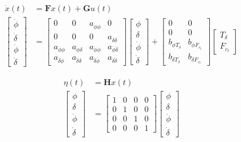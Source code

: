 \documentclass[twocolumn,10pt]{asme2e}
\begin{document}
\begin{equation}
	\begin{split}
		\dot{x}(t) & =
		\mathbf{F}x(t) + \mathbf{G}u(t)\\
		\begin{bmatrix}
			\dot{\phi} \\
			\dot{\delta} \\
			\ddot{\phi} \\
			\ddot{\delta}
		\end{bmatrix}
		& =
		\begin{bmatrix}
			0 & 0 & a_{\dot{\phi}\phi} & 0\\
			0 & 0 & 0 & a_{\dot{\delta}\delta}\\
			a_{\ddot{\phi}\phi} & a_{\ddot{\phi}\delta} &
			a_{\ddot{\phi}\dot{\phi}} & a_{\ddot{\phi}\dot{\delta}}\\
			a_{\ddot{\delta}\phi} & a_{\ddot{\delta}\delta} &
			a_{\ddot{\delta}\dot{\phi}} & a_{\ddot{\delta}\dot{\delta}}
		\end{bmatrix}
		\begin{bmatrix}
			\phi \\
			\delta \\
			\dot{\phi} \\
			\dot{\delta}
		\end{bmatrix}
		+
		\begin{bmatrix}
			0 & 0 \\
			0 & 0\\
			b_{\ddot{\phi}T_\delta} & b_{\ddot{\phi}F_{c_l}}\\
			b_{\ddot{\delta}T_\delta} & b_{\ddot{\delta}F_{c_l}}
		\end{bmatrix}
		\begin{bmatrix}
			T_\delta\\
			F_{c_l}
		\end{bmatrix}
	\end{split}
\end{equation}

\begin{equation}
	\begin{split}
		\eta(t) & = \mathbf{H}x(t)\\
		\begin{bmatrix}
			\phi \\
			\delta \\
			\dot{\phi} \\
			\dot{\delta}
		\end{bmatrix}
		& =
		\begin{bmatrix}
			1 & 0 & 0 & 0 \\
			0 & 1 & 0 & 0 \\
			0 & 0 & 1 & 0 \\
			0 & 0 & 0 & 1
		\end{bmatrix}
		\begin{bmatrix}
			\phi \\
			\delta \\
			\dot{\phi} \\
			\dot{\delta}
		\end{bmatrix}
	\end{split}
\end{equation}
\end{document}
